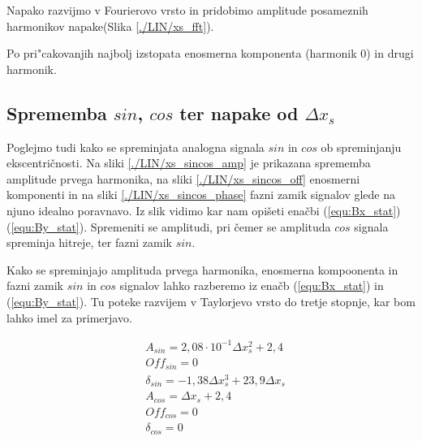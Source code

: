 
Napako razvijmo v Fourierovo vrsto in pridobimo amplitude posameznih harmonikov napake(Slika \ref{./LIN/xs_fft}).

Po pri"cakovanjih najbolj izstopata enosmerna komponenta (harmonik 0) in drugi harmonik.
\newpage
\subsection{Sprememba $sin$, $cos$ ter napake od $\Delta x_s$}

Poglejmo tudi kako se spreminjata analogna signala $sin$ in $cos$ ob spreminjanju ekscentričnosti. Na sliki \ref{./LIN/xs_sincos_amp} je prikazana sprememba amplitude prvega harmonika, na sliki \ref{./LIN/xs_sincos_off} enosmerni komponenti in na sliki \ref{./LIN/xs_sincos_phase} fazni zamik signalov glede na njuno idealno poravnavo. Iz slik vidimo kar nam opišeti enačbi (\ref{equ:Bx_stat})(\ref{equ:By_stat}). Spremeniti se amplitudi, pri čemer se amplituda $cos$ signala spreminja hitreje, ter fazni zamik $sin$.



Kako se spreminjajo amplituda prvega harmonika, enosmerna kompoonenta in fazni zamik $sin$ in $cos$ signalov lahko razberemo iz enačb (\ref{equ:Bx_stat}) in (\ref{equ:By_stat}). Tu poteke razvijem v Taylorjevo vrsto do tretje stopnje, kar bom lahko imel za primerjavo.

\begin{eqnarray}
\label{analog_lin_xs}
&A_{sin} = 2,08 \cdot 10^{-1} \Delta x_s^2+2,4\\
&Off_{sin} = 0 \\
&\delta_{sin} =-1,38 \Delta x_s^3+ 23,9 \Delta x_s  \\
&A_{cos} = \Delta x_s+2,4\\
&Off_{cos} = 0 \\
&\delta_{cos} = 0
\end{eqnarray}

